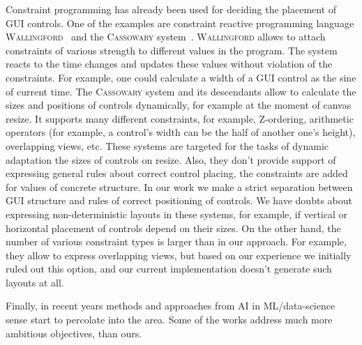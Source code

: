Constraint programming has already been used for deciding the placement of GUI controls. One of the examples are constraint reactive programming
language \textsc{Wallingford}~\cite{Wallingford2016} and the \textsc{Cassowary} system~\cite{Cassowary2001}. \textsc{Wallingford} allows to attach
constraints of various strength to different values in the program. The system reacts to the time changes and updates these values without violation
of the constraints. For example, one could calculate a width of a GUI control as the sine of current time. The \textsc{Cassowary} system and its
descendants allow to calculate the sizes and positions of controls dynamically, for example at the moment of canvas resize.
It supports many different constraints, for example, Z-ordering, arithmetic operators (for example, a control's width can be the half
of another one's height), overlapping views, etc.  These systems are targeted for the tasks of dynamic adaptation the sizes of controls on resize.
Also, they don't provide support of expressing general rules about correct control placing, the constraints are added for values of concrete structure.
In our work we make a strict separation between GUI structure and rules of correct positioning of controls. We have doubts about expressing non-deterministic
layouts in these systems, for example, if vertical or horizontal placement of controls depend on their sizes. On the other hand, the number of various
constraint types is larger than in our approach. For example, they allow to express overlapping views, but based on our experience we initially ruled out
this option, and our current implementation doesn't generate such layouts at all.

Finally, in recent years methods and approaches from AI in ML/data-science sense start to percolate into the area. Some of the works address much more
ambitious objectives, than ours.

